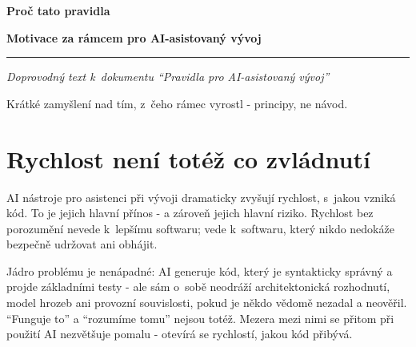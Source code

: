 

\renewcommand{\versionline}{doprovodný text}
\renewcommand{\doctitle}{Proč tato pravidla — motivace za rámcem}



\thispagestyle{empty}
\vspace*{3cm}
{\sffamily\fontsize{30}{34}\selectfont\bfseries\color{navy}Proč tato pravidla\par}
\vspace{4pt}
{\sffamily\Large\bfseries\color{blue}Motivace za rámcem pro AI-asistovaný vývoj\par}
\vspace{10pt}
{\color{blue}\rule{\linewidth}{1.5pt}}\par
\vspace{12pt}
{\sffamily\large\itshape\color{black!55}Doprovodný text k~dokumentu \enquote{Pravidla pro AI-asistovaný vývoj}\par}
\vspace{20pt}
{\sffamily\small\color{black!50}
Krátké zamyšlení nad tím, z~čeho rámec vyrostl - principy, ne návod.\par}
\vfill
\newpage

\section{Rychlost není totéž co zvládnutí}

AI nástroje pro asistenci při vývoji dramaticky zvyšují rychlost, s~jakou vzniká kód.
To je jejich hlavní přínos - a zároveň jejich hlavní riziko.
Rychlost bez porozumění nevede k~lepšímu softwaru; vede k~softwaru, který nikdo nedokáže bezpečně udržovat ani obhájit.

Jádro problému je nenápadné: AI generuje kód, který je syntakticky správný a projde základními testy - ale sám o~sobě neodráží architektonická rozhodnutí, model hrozeb ani provozní souvislosti, pokud je někdo vědomě nezadal a neověřil.
\enquote{Funguje to} a \enquote{rozumíme tomu} nejsou totéž.
Mezera mezi nimi se přitom při použití AI nezvětšuje pomalu - otevírá se rychlostí, jakou kód přibývá.

